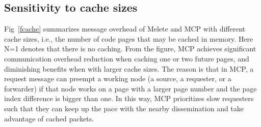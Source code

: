 \subsection{Sensitivity to cache sizes}
Fig~\ref{fcache} summarizes message overhead of Melete and MCP with different cache sizes, i.e., the number of code pages that may be cached in memory. Here N=1 denotes that there is no caching. From the figure, MCP achieves significant communication overhead reduction when caching one or two future pages, and diminishing benefits when with larger cache sizes. The reason is that in MCP, a request message can preempt a working node (a source, a requester, or a forwarder) if that node works on a page with a larger page number and the page index difference is bigger than one. In this way, MCP prioritizes slow requesters such that they can keep up the pace with the nearby dissemination and take advantage of cached packets.










